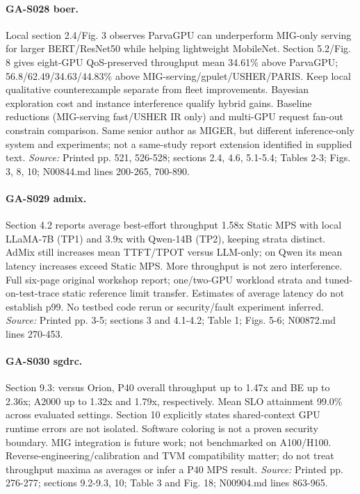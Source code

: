 \paragraph{GA-S028 boer.} Local section 2.4/Fig. 3 observes ParvaGPU can underperform MIG-only serving for larger BERT/ResNet50 while helping lightweight MobileNet. Section 5.2/Fig. 8 gives eight-GPU QoS-preserved throughput mean 34.61\% above ParvaGPU; 56.8/62.49/34.63/44.83\% above MIG-serving/gpulet/USHER/PARIS. Keep local qualitative counterexample separate from fleet improvements. Bayesian exploration cost and instance interference qualify hybrid gains. Baseline reductions (MIG-serving fast/USHER IR only) and multi-GPU request fan-out constrain comparison. Same senior author as MIGER, but different inference-only system and experiments; not a same-study report extension identified in supplied text. \textit{Source:} Printed pp. 521, 526-528; sections 2.4, 4.6, 5.1-5.4; Tables 2-3; Figs. 3, 8, 10; N00844.md lines 200-265, 700-890.

\paragraph{GA-S029 admix.} Section 4.2 reports average best-effort throughput 1.58x Static MPS with local LLaMA-7B (TP1) and 3.9x with Qwen-14B (TP2), keeping strata distinct. AdMix still increases mean TTFT/TPOT versus LLM-only; on Qwen its mean latency increases exceed Static MPS. More throughput is not zero interference. Full six-page original workshop report; one/two-GPU workload strata and tuned-on-test-trace static reference limit transfer. Estimates of average latency do not establish p99. No testbed code rerun or security/fault experiment inferred. \textit{Source:} Printed pp. 3-5; sections 3 and 4.1-4.2; Table 1; Figs. 5-6; N00872.md lines 270-453.

\paragraph{GA-S030 sgdrc.} Section 9.3: versus Orion, P40 overall throughput up to 1.47x and BE up to 2.36x; A2000 up to 1.32x and 1.79x, respectively. Mean SLO attainment 99.0\% across evaluated settings. Section 10 explicitly states shared-context GPU runtime errors are not isolated. Software coloring is not a proven security boundary. MIG integration is future work; not benchmarked on A100/H100. Reverse-engineering/calibration and TVM compatibility matter; do not treat throughput maxima as averages or infer a P40 MPS result. \textit{Source:} Printed pp. 276-277; sections 9.2-9.3, 10; Table 3 and Fig. 18; N00904.md lines 863-965.

